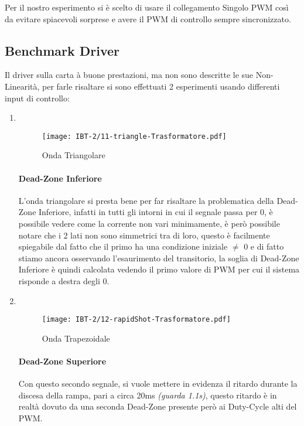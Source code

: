 \noindent
Per il nostro esperimento si è scelto di usare il collegamento Singolo PWM così da evitare spiacevoli sorprese e avere il PWM di controllo sempre sincronizzato.	

\newpage
\subsection{Benchmark Driver}
Il driver sulla carta à buone prestazioni, ma non sono descritte le sue Non-Linearità, per farle risaltare si sono effettuati 2 esperimenti usando differenti input di controllo:
\begin{enumerate}
	\item {} \\ \vspace{-11mm}
	      \begin{figure}[h]
		      \centering
		      \texttt{[image: IBT-2/11-triangle-Trasformatore.pdf]}
		      \caption[Esperimento con Onda Triangolare]{Onda Triangolare}
	      \end{figure}\vspace{-10mm}
	      \paragraph{Dead-Zone Inferiore} L'onda triangolare si presta bene per far risaltare la problematica della Dead-Zone Inferiore, infatti in tutti gli intorni in cui il segnale passa per 0, è possibile vedere come la corrente non vari minimamente, è però possibile notare che i 2 lati non sono simmetrici tra di loro, questo è facilmente spiegabile dal fatto che il primo ha una condizione iniziale $ \neq $ 0 e di fatto stiamo ancora osservando l'esaurimento del transitorio, la soglia di Dead-Zone Inferiore è quindi calcolata vedendo il primo valore di PWM  per cui il sistema risponde a destra degli 0.      
	      
	      \newpage
	\item {} \\
	      \begin{figure}[h]
		      \centering
		      \texttt{[image: IBT-2/12-rapidShot-Trasformatore.pdf]}
		      \caption[Esperimento con Onda Trapezoidale]{Onda Trapezoidale}
	      \end{figure}  \vspace{-10mm}
	      \paragraph{Dead-Zone Superiore} Con questo secondo segnale, si vuole mettere in evidenza il ritardo durante la discesa della rampa, pari a circa 20ms {\small \textit{(guarda 1.1s)}}, questo ritardo è in realtà dovuto da una seconda Dead-Zone presente però ai Duty-Cycle alti del PWM.
	      \vspace{-5mm}

\end{enumerate}
